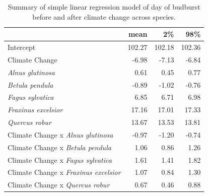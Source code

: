 \documentclass{article}\usepackage[]{graphicx}\usepackage[]{color}
\begin{document}
\begin{table}[H]
\centering
\caption{Summary of simple linear regression model of day of budburst before and after climate change across species.} 
\label{tab:simbbmod}
\begin{tabular}{lrrr}
  \hline
 & mean & 2\% & 98\% \\ 
  \hline
Intercept & 102.27 & 102.18 & 102.36 \\ 
  Climate Change & -6.98 & -7.13 & -6.84 \\ 
  \textit{Alnus glutinosa} & 0.61 & 0.45 & 0.77 \\ 
  \textit{Betula pendula} & -0.89 & -1.02 & -0.76 \\ 
  \textit{Fagus sylvatica} & 6.85 & 6.71 & 6.98 \\ 
  \textit{Fraxinus excelsior} & 17.16 & 17.01 & 17.33 \\ 
  \textit{Quercus robur} & 13.67 & 13.53 & 13.81 \\ 
  Climate Change x \textit{Alnus glutinosa} & -0.97 & -1.20 & -0.74 \\ 
  Climate Change x \textit{Betula pendula} & 1.06 & 0.86 & 1.26 \\ 
  Climate Change x \textit{Fagus sylvatica} & 1.61 & 1.41 & 1.82 \\ 
  Climate Change x \textit{Fraxinus excelsior} & 1.07 & 0.84 & 1.30 \\ 
  Climate Change x \textit{Quercus robur} & 0.67 & 0.46 & 0.88 \\ 
   \hline
\end{tabular}
\end{table}
\end{document}
